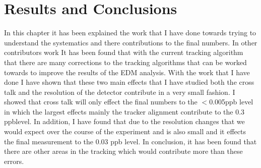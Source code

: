 \documentclass[./Thesis]{subfiles}
\begin{document}
\section{Results and Conclusions}

	In this chapter it has been explained the work that I have done towards trying to understand the systematics and there contributions to the final numbers. In other contributors work It has been found that with the current tracking algorithm that there are many corrections to the tracking algorithms that can be worked towards to improve the results of the EDM analysis. With the work that I have done I have shown that these two main effects that I have studied both the cross talk and the resolution of the detector contribute in a very small fashion. I showed that cross talk will only effect the final numbers to the $<$0.005ppb level in which the largest effects mainly the tracker alignment contribute to the 0.3 ppblevel. In addition, I have found that due to the resolution changes that we would expect over the course of the experiment and is also small and it effects the final measurement to the 0.03 ppb level. In conclusion, it has been found that there are other areas in the tracking which would contribute more than these errors.
\end{document}

